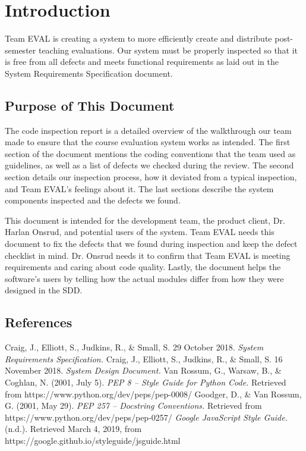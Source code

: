 \documentclass{article}
\begin{document}
\tableofcontents

\newpage

\section{Introduction}

Team EVAL is creating a system to more efficiently create and distribute post-semester teaching evaluations. Our system must be properly inspected so that it is free from all defects and meets functional requirements as laid out in the System Requirements Specification document.
 
\subsection{Purpose of This Document}

The code inspection report is a detailed overview of the walkthrough our team made to ensure that the course evaluation system works as intended. The first section of the document mentions the coding conventions that the team used as guidelines, as well as a list of defects we checked during the review. The second section details our inspection process, how it deviated from a typical inspection, and Team EVAL's feelings about it. The last sections describe the system components inspected and the defects we found.

This document is intended for the development team, the product client, Dr. Harlan Onsrud, and potential users of the system. Team EVAL needs this document to fix the defects that we found during inspection and keep the defect checklist in mind. Dr. Onsrud needs it to confirm that Team EVAL is meeting requirements and caring about code quality. Lastly, the document helps the software's users by telling how the actual modules differ from how they were designed in the SDD.

\subsection{References}

Craig, J., Elliott, S., Judkins, R., \& Small, S. 29 October 2018. \textit{System Requirements Specification.}
\vspace{3mm}\newline
Craig, J., Elliott, S., Judkins, R., \& Small, S. 16 November 2018. \textit{System Design Document.}
\vspace{3mm}\newline
Van Rossum, G., Warsaw, B., \& Coghlan, N. (2001, July 5). \textit{PEP 8 -- Style Guide for Python Code.} Retrieved from https://www.python.org/dev/peps/pep-0008/
\vspace{3mm}\newline
Goodger, D., \& Van Rossum, G. (2001, May 29). \textit{PEP 257 -- Docstring Conventions.} Retrieved from https://www.python.org/dev/peps/pep-0257/
\vspace{3mm}\newline
\textit{Google JavaScript Style Guide.} (n.d.). Retrieved March 4, 2019, from https://google.github.io/styleguide/\newline jsguide.html
\end{document}
